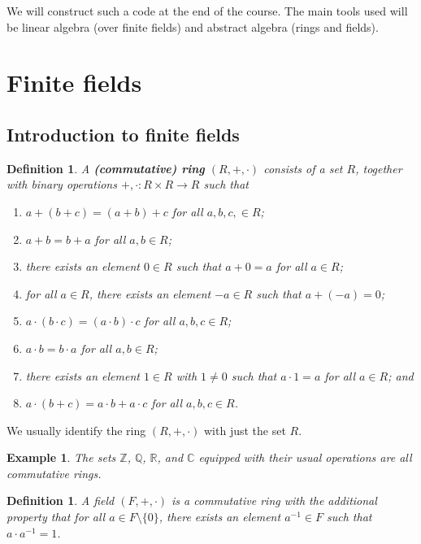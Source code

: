 \documentclass[10pt]{article}
\newcommand{\R}{\mathbb{R}}
\newcommand{\C}{\mathbb{C}}
\newcommand{\Z}{\mathbb{Z}}
\newcommand{\Q}{\mathbb{Q}}
\theoremstyle{newstyle}
\newtheorem{defn}[thm]{Definition}
\newtheorem{exmp}[thm]{Example}
\begin{document}
We will construct such a code at the end of the course. The main tools used will be linear algebra 
(over finite fields) and abstract algebra (rings and fields).

\newpage 
\section{Finite fields}

\subsection{Introduction to finite fields}

\begin{defn}
A {\bf (commutative) ring} $(R, +, \cdot)$ consists of a set $R$, together with binary operations 
$+, \cdot : R \times R \to R$ such that 
\begin{enumerate}[(1)]
    \item $a + (b+c) = (a+b)+c$ for all $a, b, c, \in R$; 
    \item $a+b=b+a$ for all $a, b \in R$;
    \item there exists an element $0 \in R$ such that $a+0=a$ for all $a \in R$;
    \item for all $a \in R$, there exists an element $-a \in R$ such that $a+(-a) = 0$;
    \item $a \cdot (b \cdot c) = (a \cdot b) \cdot c$ for all $a, b, c \in R$;
    \item $a \cdot b = b \cdot a$ for all $a, b \in R$;
    \item there exists an element $1 \in R$ with $1 \neq 0$ such that $a \cdot 1 = a$ for all 
    $a \in R$; and 
    \item $a \cdot (b+c) = a \cdot b + a \cdot c$ for all $a, b, c \in R$.
\end{enumerate}
\end{defn}
We usually identify the ring $(R, +, \cdot)$ with just the set $R$. 

\begin{exmp}
The sets $\Z$, $\Q$, $\R$, and $\C$ equipped with their usual operations are all commutative rings. 
\end{exmp}

\begin{defn}
A field $(F, +, \cdot)$ is a commutative ring with the additional property that 
for all $a \in F \setminus \{0\}$, there exists an element $a^{-1} \in F$ such that 
$a \cdot a^{-1} = 1$.
\end{defn}
\end{document}
